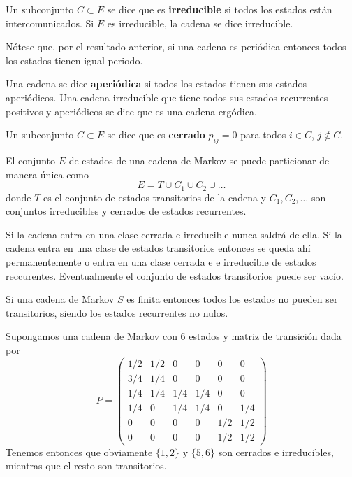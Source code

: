 \documentclass[PREyA.tex]{subfiles}
\begin{document}
\begin{defi}
Un subconjunto $C\subset E$ se dice que es \textbf{irreducible} si todos los estados están intercomunicados. Si $E$ es irreducible, la cadena se dice irreducible.
\end{defi}
\begin{nota}
Nótese que, por el resultado anterior, si una cadena es periódica entonces todos los estados tienen igual periodo.
\end{nota}
\begin{defi}
Una cadena se dice \textbf{aperiódica} si todos los estados tienen sus estados aperiódicos. Una cadena irreducible que tiene todos sus estados recurrentes positivos y aperiódicos se dice que es una cadena ergódica.
\end{defi}
\begin{defi}
Un subconjunto $C\subset E$ se dice que es \textbf{cerrado} $p_{ij}=0$ para todos $i\in C$, $j\not\in C$.
\end{defi}
\begin{theorem}
El conjunto $E$ de estados de una cadena de Markov se puede particionar de manera única como
$$
E=T\cup C_1\cup C_2 \cup \dotsc
$$
donde $T$ es el conjunto de estados transitorios de la cadena y $C_1,C_2,\dotsc$ son conjuntos irreducibles y cerrados de estados recurrentes.
\end{theorem}
\begin{nota}
Si la cadena entra en una clase cerrada e irreducible nunca saldrá de ella. Si la cadena entra en una clase de estados transitorios entonces se queda ahí permanentemente o entra en una clase cerrada e e irreducible de estados reccurentes. Eventualmente el conjunto de estados transitorios puede ser vacío.
\end{nota}
\begin{theorem}
Si una cadena de Markov $S$ es finita entonces todos los estados no pueden ser transitorios, siendo los estados recurrentes no nulos.
\end{theorem}
\begin{example}
Supongamos una cadena de Markov con $6$ estados y matriz de transición dada por 
$$
P=
\begin{pmatrix}
1/2 & 1/2 & 0 & 0 & 0 & 0\\
3/4 & 1/4 & 0 & 0 & 0 & 0\\
1/4 & 1/4 & 1/4 & 1/4 & 0 & 0\\
1/4 & 0 & 1/4 & 1/4 & 0 & 1/4\\
0 & 0 & 0 &0 & 1/2 & 1/2\\
0 & 0 & 0 &0 & 1/2 & 1/2
\end{pmatrix}
$$
Tenemos entonces que obviamente $\{1,2\}$ y $\{5,6\}$ son cerrados e irreducibles, mientras que el resto son transitorios.
\end{example}
\end{document}
